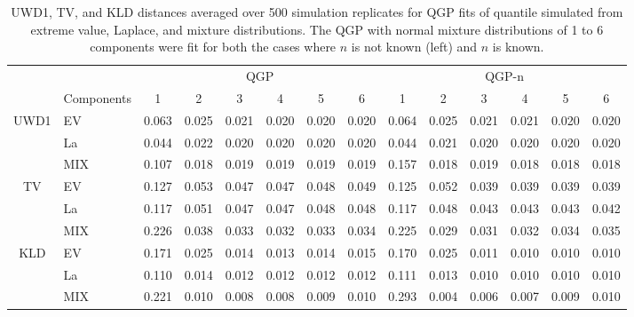 \documentclass[preprint,12pt,authoryear]{elsarticle}
\begin{document}
\newpage

\begin{table}[hbt!]
\footnotesize
\centering
\caption{UWD1, TV, and KLD distances averaged over 500 simulation replicates
for QGP fits of quantile simulated from extreme value, Laplace, and
mixture distributions. The QGP with normal 
mixture distributions of 1 to 6 components were fit for both the cases where 
$n$ is not known (left) and $n$ is known.}
\begin{adjustbox}{center}
\begin{tabular}{clcccccc|cccccc}
& & \multicolumn{6}{c}{QGP} & \multicolumn{6}{c}{QGP-n} \\
\cmidrule(lr){3-8} \cmidrule(lr){9-14}
& Components & 1 & 2 & 3 & 4 & 5 & 6 & 1 & 2 & 3 & 4 & 5 & 6 \\
\midrule
\multirow{3}{*}{UWD1} &
EV & 0.063 & 0.025 & 0.021 & 0.020 & 0.020 & 0.020 & 
      0.064 & 0.025 & 0.021 & 0.021 & 0.020 & 0.020\\
 & La & 0.044 & 0.022 & 0.020 & 0.020 & 0.020 & 0.020 & 
      0.044 & 0.021 & 0.020 & 0.020 & 0.020 & 0.020 \\
 & MIX & 0.107 & 0.018 & 0.019 & 0.019 & 0.019 & 0.019 & 
      0.157 & 0.018 & 0.019 & 0.018 & 0.018 & 0.018 \\
      \hline
\multirow{3}{*}{TV} &
EV & 0.127 & 0.053 & 0.047 & 0.047 & 0.048 & 0.049 &
      0.125 & 0.052 & 0.039 & 0.039 & 0.039 & 0.039\\
 & La & 0.117 & 0.051 & 0.047 & 0.047 & 0.048 & 0.048 &
      0.117 & 0.048 & 0.043 & 0.043 & 0.043 & 0.042 \\
 & MIX & 0.226 & 0.038 & 0.033 & 0.032 & 0.033 & 0.034 &
      0.225 & 0.029 & 0.031 & 0.032 & 0.034 & 0.035 \\
      \hline
\multirow{3}{*}{KLD} &
EV & 0.171 & 0.025 & 0.014 & 0.013 & 0.014 & 0.015 & 
      0.170 & 0.025 & 0.011 & 0.010 & 0.010 & 0.010\\
& La & 0.110 & 0.014 & 0.012 & 0.012 & 0.012 & 0.012 & 
      0.111 & 0.013 & 0.010 & 0.010 & 0.010 & 0.010 \\
& MIX & 0.221 & 0.010 & 0.008 & 0.008 & 0.009 & 0.010 & 
      0.293 & 0.004 & 0.006 & 0.007 & 0.009 & 0.010
\end{tabular}
\end{adjustbox}
\label{tab:mix_comps}
\end{table}
\end{document}
